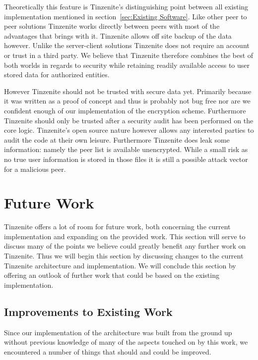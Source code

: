 Theoretically this feature is Tinzenite's distinguishing point between all existing implementation mentioned in section~\ref{sec:Existing Software}.
Like other peer to peer solutions Tinzenite works directly between peers with most of the advantages that brings with it.
Tinzenite allows off site backup of the data however.
Unlike the server-client solutions Tinzenite does not require an account or trust in a third party.
We believe that Tinzenite therefore combines the best of both worlds in regards to security while retaining readily available access to user stored data for authorized entities.

However Tinzenite should not be trusted with secure data yet.
Primarily because it was written as a proof of concept and thus is probably not bug free nor are we confident enough of our implementation of the encryption scheme.
Furthermore Tinzenite should only be trusted after a security audit has been performed on the core logic.
Tinzenite's open source nature however allows any interested parties to audit the code at their own leisure.
Furthermore Tinzenite does leak some information: namely the peer list is available unencrypted.
While a small risk as no true user information is stored in those files it is still a possible attack vector for a malicious peer.

\section{Future Work}
\label{sec:Future Work}

Tinzenite offers a lot of room for future work, both concerning the current implementation and expanding on the provided work.
This section will serve to discuss many of the points we believe could greatly benefit any further work on Tinzenite.
Thus we will begin this section by discussing changes to the current Tinzenite architecture and implementation.
We will conclude this section by offering an outlook of further work that could be based on the existing implementation.

\subsection{Improvements to Existing Work}
\label{sub:Improvements to Existing Work}

Since our implementation of the architecture was built from the ground up without previous knowledge of many of the aspects touched on by this work, we encountered a number of things that should and could be improved.

